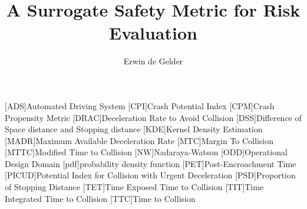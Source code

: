 \documentclass[3p,onecolumn,authoryear]{elsarticle}
\title{A Surrogate Safety Metric for Risk Evaluation}
\author[1,2]{Erwin de Gelder\corref{cor1}}
\date{}
\begin{document}
\begin{acronym}[AAAAAAAA]
	[ADS]{Automated Driving System}
	[CPI]{Crash Potential Index}
	[CPM]{Crash Propensity Metric}
	[DRAC]{Deceleration Rate to Avoid Collision}
	[DSS]{Difference of Space distance and Stopping distance}
	[KDE]{Kernel Density Estimation}
	[MADR]{Maximum Available Deceleration Rate}
	[MTC]{Margin To Collision}
	[MTTC]{Modified Time to Collision}
	[NW]{Nadaraya-Watson}
	[ODD]{Operational Design Domain}
	[pdf]{probability density function}
	[PET]{Post-Encroachment Time}
	[PICUD]{Potential Index for Collision with Urgent Deceleration}
	[PSD]{Proportion of Stopping Distance}
	[TET]{Time Exposed Time to Collision}
	[TIT]{Time Integrated Time to Collision}
	[TTC]{Time to Collision}
\end{acronym}

\maketitle













\end{document}
